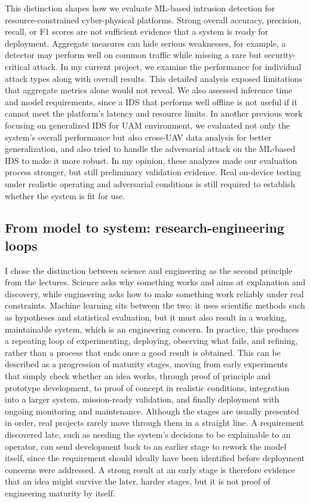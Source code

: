 \documentclass[11pt,a4paper]{article}
\begin{document}
This distinction shapes how we evaluate ML-based intrusion detection for resource-constrained cyber-physical platforms. Strong overall accuracy, precision, recall, or F1 scores are not sufficient evidence that a system is ready for deployment. Aggregate measures can hide serious weaknesses, for example, a detector may perform well on common traffic while missing a rare but security-critical attack. In my current project, we examine the performance for individual attack types along with overall results. This detailed analysis exposed limitations that aggregate metrics alone would not reveal. We also assessed inference time and model requirements, since a IDS that performs well offline is not useful if it cannot meet the platform's latency and resource limits. In another previous work focusing on generalized IDS for UAM environment, we evaluated not only the system's overall performance but also cross-UAV data analysis for better generalization, and also tried to handle the adversarial attack on the ML-based IDS to make it more robust. In my opinion, these analyzes made our evaluation process stronger, but still preliminary validation evidence. Real on-device testing under realistic operating and adversarial conditions is still required to establish whether the system is fit for use. 


\subsection{From model to system: research-engineering loops}

I chose the distinction between science and engineering as the second principle from the lectures. Science asks why something works and aims at explanation and discovery, while engineering asks how to make something work reliably under real constraints. Machine learning sits between the two: it uses scientific methods such as hypotheses and statistical evaluation, but it must also result in a working, maintainable system, which is an engineering concern. In practice, this produces a repeating loop of experimenting, deploying, observing what fails, and refining, rather than a process that ends once a good result is obtained. This can be described as a progression of maturity stages, moving from early experiments that simply check whether an idea works, through proof of principle and prototype development, to proof of concept in realistic conditions, integration into a larger system, mission-ready validation, and finally deployment with ongoing monitoring and maintenance. Although the stages are usually presented in order, real projects rarely move through them in a straight line. A requirement discovered late, such as needing the system's decisions to be explainable to an operator, can send development back to an earlier stage to rework the model itself, since the requirement should ideally have been identified before deployment concerns were addressed. A strong result at an early stage is therefore evidence that an idea might survive the later, harder stages, but it is not proof of engineering maturity by itself.
\end{document}
